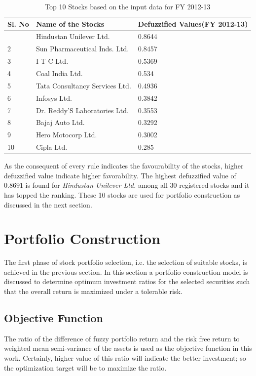 \documentclass{elsarticle}
\begin{document}
\begin{table}[h]
	\small
\caption{Top 10 Stocks based on the input data for FY 2012-13}
\begin{center}
\label{tab:Top_Stocks}
\begin{tabular}{ | >{\centering\arraybackslash}m{2cm} | >{\centering\arraybackslash}m{5cm} | >{\centering\arraybackslash}m{3.5cm} |}
\hline
\bf Sl. No & \bf Name of the Stocks & \bf Defuzzified Values(FY 2012-13)\\
\hline
{1} & {Hindustan Unilever Ltd.} & {0.8644}\\
\hline
{2} & {Sun Pharmaceutical Inds. Ltd.} & {0.8457}\\
\hline
{3} & {I T C Ltd.} & {0.5369}\\
\hline
{4} & {Coal India Ltd.} & {0.534}\\
\hline
{5} & {Tata Consultancy Services Ltd.} & {0.4936}\\
\hline
{6} & {Infosys Ltd.} & {0.3842}\\
\hline
{7} & {Dr. Reddy'S Laboratories Ltd.} & {0.3553}\\
\hline
{8} & {Bajaj Auto Ltd.} & {0.3292}\\
\hline
{9} & {Hero Motocorp Ltd.} & {0.3002}\\
\hline
{10} & {Cipla Ltd.} & {0.285}\\
\hline
\end{tabular}
\end{center}
\end{table}

As the consequent of every rule indicates the favourability of the stocks, higher defuzzified value indicate higher favorability. The highest defuzzified value of $0.8691$ is found for \emph{Hindustan Unilever Ltd.} among all 30 registered stocks and it has topped the ranking. These 10 stocks are used for portfolio construction as discussed in the next section.

\section{Portfolio Construction}
The first phase of stock portfolio selection, i.e. the selection of suitable stocks, is achieved in the previous section. In this section a portfolio construction model is discussed to determine optimum investment ratios for the selected securities such that the overall return is maximized under a tolerable risk. 
\subsection{Objective Function}
The ratio of the difference of fuzzy portfolio return and the risk free return to weighted mean semi-variance of the assets is used as the objective function in this work. Certainly, higher value of this ratio will indicate the better investment; so the optimization target will be to maximize the ratio.
\end{document}
